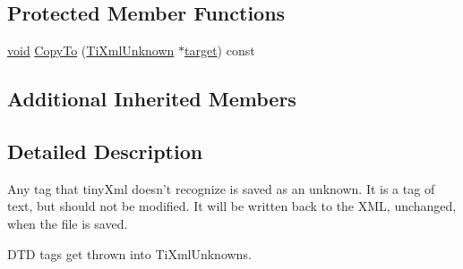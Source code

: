 \subsection*{Protected Member Functions}
\begin{DoxyCompactItemize}
\item 
\hyperlink{wglew_8h_aeea6e3dfae3acf232096f57d2d57f084}{void} \hyperlink{class_ti_xml_unknown_a08ca7b225a2bcb604d3c72e199d33408}{Copy\-To} (\hyperlink{class_ti_xml_unknown}{Ti\-Xml\-Unknown} $\ast$\hyperlink{glew_8h_aa43eab0fe80422366a4602998d53b133}{target}) const 
\end{DoxyCompactItemize}
\subsection*{Additional Inherited Members}


\subsection{Detailed Description}
Any tag that tiny\-Xml doesn't recognize is saved as an unknown. It is a tag of text, but should not be modified. It will be written back to the X\-M\-L, unchanged, when the file is saved.

D\-T\-D tags get thrown into Ti\-Xml\-Unknowns. 

